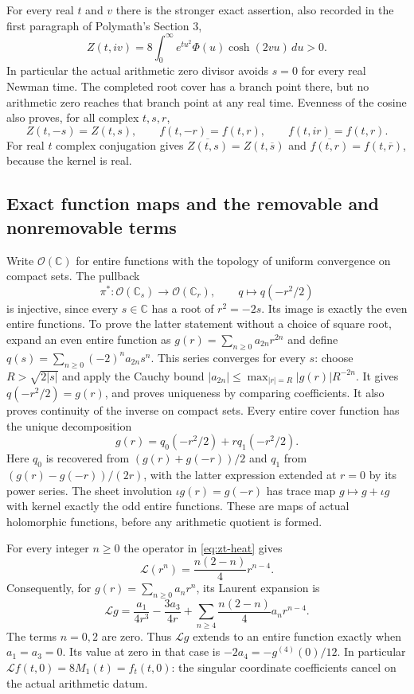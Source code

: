For every real $t$ and $v$ there is the stronger exact assertion, also
recorded in the first paragraph of Polymath's
Section 3\cite{polymath2019},
\begin{equation}
 Z(t,iv)=8\int_0^\infty e^{tu^2}\Phi(u)\cosh(2vu)\,du>0.
 \label{eq:zt-imaginary-axis-positive}
\end{equation}
In particular the actual arithmetic zero divisor avoids $s=0$ for every
real Newman time.  The completed root cover has a branch point there,
but no arithmetic zero reaches that branch point at any real time.
Evenness of the cosine also proves, for all complex $t,s,r$,
\begin{equation}
 Z(t,-s)=Z(t,s),\qquad f(t,-r)=f(t,r),\qquad f(t,ir)=f(t,r).
 \label{eq:zt-symmetries}
\end{equation}
For real $t$ complex conjugation gives
$\overline{Z(t,s)}=Z(t,\overline s)$ and
$\overline{f(t,r)}=f(t,\overline r)$, because the kernel is real.

\subsection{Exact function maps and the removable and nonremovable terms}

Write $\mathcal O(\mathbb C)$ for entire functions with the topology of
uniform convergence on compact sets.  The pullback
\[
 \pi^*: \mathcal O(\mathbb C_s)\longrightarrow\mathcal O(\mathbb C_r),
 \qquad q\longmapsto q(-r^2/2)
\]
is injective, since every $s\in\mathbb C$ has a root of $r^2=-2s$.
Its image is exactly the even entire functions.  To prove the latter
statement without a choice of square root, expand an even entire
function as $g(r)=\sum_{n\geq0}a_{2n}r^{2n}$ and define
$q(s)=\sum_{n\geq0}(-2)^na_{2n}s^n$.  This series converges for every
$s$: choose $R>\sqrt{2|s|}$ and apply the Cauchy bound
$|a_{2n}|\leq\max_{|r|=R}|g(r)|R^{-2n}$.  It gives
$q(-r^2/2)=g(r)$, and proves uniqueness by comparing coefficients.
It also proves continuity of the inverse on compact sets.  Every entire
cover function has the unique decomposition
\[
 g(r)=q_0(-r^2/2)+r q_1(-r^2/2).
\]
Here $q_0$ is recovered from $(g(r)+g(-r))/2$ and $q_1$ from
$(g(r)-g(-r))/(2r)$, with the latter expression extended at $r=0$
by its power series.  The sheet involution $\iota g(r)=g(-r)$ has
trace map $g\mapsto g+\iota g$ with kernel exactly the odd entire
functions.  These are maps of actual holomorphic functions, before any
arithmetic quotient is formed.

For every integer $n\geq0$ the operator in \eqref{eq:zt-heat} gives
\begin{equation}
 \mathcal L(r^n)=\frac{n(2-n)}4r^{n-4}.
 \label{eq:zt-monomials}
\end{equation}
Consequently, for $g(r)=\sum_{n\geq0}a_nr^n$, its Laurent expansion is
\[
 \mathcal Lg=\frac{a_1}{4r^3}-\frac{3a_3}{4r}
       +\sum_{n\geq4}\frac{n(2-n)}4a_nr^{n-4}.
\]
The terms $n=0,2$ are zero.  Thus $\mathcal Lg$ extends to an entire
function exactly when $a_1=a_3=0$.  Its value at zero in that case is
$-2a_4=-g^{(4)}(0)/12$.  In particular
$\mathcal L f(t,0)=8M_1(t)=f_t(t,0)$: the singular coordinate
coefficients cancel on the actual arithmetic datum.

